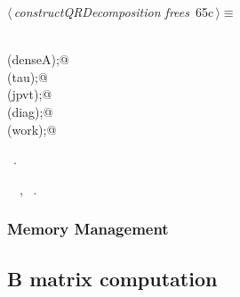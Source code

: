 \documentclass{article}
\begin{document}
\begin{flushleft} \small
\begin{minipage}{\linewidth}\label{scrap98}\raggedright\small
{} $\langle\,${\itshape constructQRDecomposition frees}\nobreak\ {\footnotesize {65c}}$\,\rangle\equiv$
\vspace{-1ex}
\begin{list}{}{} \item
\mbox{}\verb@@\\
\mbox{}\verb@free(denseA);@\\
\mbox{}\verb@free(tau);@\\
\mbox{}\verb@free(jpvt);@\\
\mbox{}\verb@free(diag);@\\
\mbox{}\verb@free(work);@\\
\mbox{}\verb@@{\NWsep}
\end{list}
\vspace{-1.5ex}
\footnotesize
\begin{list}{}{\setlength{\itemsep}{-\parsep}\setlength{\itemindent}{-\leftmargin}}
\item \NWtxtMacroRefIn\ .
\item \NWtxtIdentsUsed\nobreak\  \verb@diag@\nobreak\ , \verb@work@\nobreak\ .
\item{}
\end{list}
\end{minipage}\vspace{4ex}
\end{flushleft}
\subsubsection{Memory Management}



\subsection{B matrix computation}
\label{sec:bmat}
\end{document}
